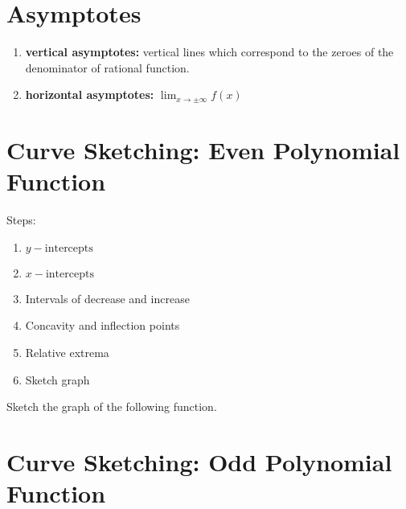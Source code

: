 \section{Asymptotes}

\begin{myframe}[arc=10pt,auto outer arc]
\begin{enumerate}
	\item \textbf{vertical asymptotes:} vertical lines which correspond to the zeroes of the denominator of rational function.
	\item \textbf{horizontal asymptotes:} $\displaystyle \lim_{x\rightarrow \pm \infty} f(x)$
\end{enumerate}
\end{myframe}



\makenewpage
\section{Curve Sketching: Even Polynomial Function}

\begin{myframe}[arc=10pt,auto outer arc]
	Steps:
	\begin{enumerate}
\item $y-\textrm{intercepts}$
\item $x-\textrm{intercepts}$
\item Intervals of decrease and increase
\item Concavity and inflection points
\item Relative extrema
\item Sketch graph
	\end{enumerate}
\end{myframe}

\noindent Sketch the graph of the following function.



\makenewpage
\section{Curve Sketching: Odd Polynomial Function}

